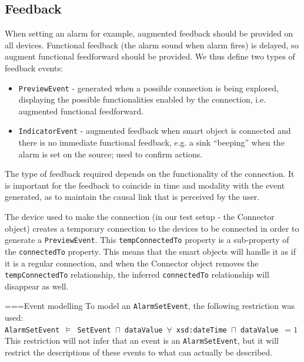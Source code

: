 \subsection{Feedback}
When setting an alarm for example, augmented feedback should be provided on all devices. Functional feedback (the alarm sound when alarm fires) is delayed, so augment functional feedforward should be provided. We thus define two types of feedback events:

\begin{itemize}
\item \texttt{PreviewEvent} - generated when a possible connection is being explored, displaying the possible functionalities enabled by the connection, i.e. augmented functional feedforward.
\item \texttt{IndicatorEvent} - augmented feedback when smart object is connected and there is no immediate functional feedback, e.g. a sink ``beeping'' when the alarm is set on the source; used to confirm actions.   
\end{itemize} 

The type of feedback required depends on the functionality of the connection. It is important for the feedback to coincide in time and modality with the event generated, as to maintain the causal link that is perceived by the user.

The device used to make the connection (in our test setup - the Connector object) creates a temporary connection to the devices to be connected in order to generate a \texttt{PreviewEvent}. This \texttt{tempConnectedTo} property is a sub-property of the \texttt{connectedTo} property. This means that the smart objects will handle it as if it is a regular connection, and when the Connector object removes the \texttt{tempConnectedTo} relationship, the inferred \texttt{connectedTo} relationship will disappear as well.




===Event modelling
To model an \texttt{AlarmSetEvent}, the following restriction was used:\\

\noindent
\texttt{AlarmSetEvent}~$\models$~\texttt{SetEvent}~$\sqcap$~\texttt{dataValue}~$\forall$~\texttt{xsd:dateTime}~$\sqcap$~\texttt{dataValue}~$= 1$\\

This restriction will not infer that an event is an \texttt{AlarmSetEvent}, but it will restrict the descriptions of these events to what can actually be described.





